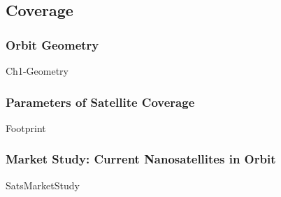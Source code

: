 \subsection{Coverage}


\subsubsection{Orbit Geometry}
{Ch1-Geometry}

\subsubsection{Parameters of Satellite Coverage}
{Footprint}




\subsubsection{Market Study: Current Nanosatellites in Orbit}
{SatsMarketStudy}